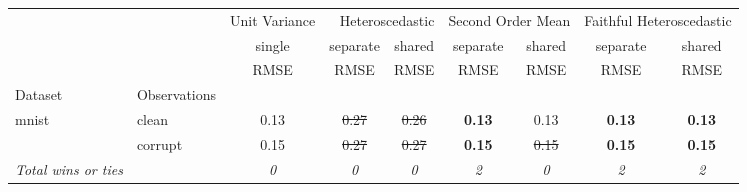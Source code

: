 \begin{tabular}{ll|c|cc|cc|cc}
\toprule
{} & {} & {Unit Variance} & \multicolumn{2}{r}{Heteroscedastic} & \multicolumn{2}{r}{Second Order Mean} & \multicolumn{2}{r}{Faithful Heteroscedastic} \\
{} & {} & {single} & {separate} & {shared} & {separate} & {shared} & {separate} & {shared} \\
{} & {} & {RMSE} & {RMSE} & {RMSE} & {RMSE} & {RMSE} & {RMSE} & {RMSE} \\
{Dataset} & {Observations} & {} & {} & {} & {} & {} & {} & {} \\
\midrule
\multirow[t]{2}{*}{mnist} & clean & 0.13 & \sout{0.27} & \sout{0.26} & \textbf{0.13} & 0.13 & \textbf{0.13} & \textbf{0.13} \\
 & corrupt & 0.15 & \sout{0.27} & \sout{0.27} & \textbf{0.15} & \sout{0.15} & \textbf{0.15} & \textbf{0.15} \\
\textit{{Total wins or ties}} &  & \textit{0} & \textit{0} & \textit{0} & \textit{2} & \textit{0} & \textit{2} & \textit{2} \\
\bottomrule
\end{tabular}
